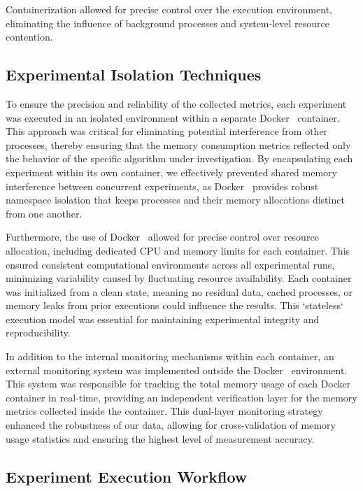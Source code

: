 Containerization allowed for precise control over the execution environment, eliminating the influence of background processes and system-level resource contention.

\subsection{Experimental Isolation Techniques}
\label{subsec:mmc-experimental-isolation-techniques}

To ensure the precision and reliability of the collected metrics, each experiment was executed in an isolated environment within a separate Docker~\cite{docker} container.
This approach was critical for eliminating potential interference from other processes, thereby ensuring that the memory consumption metrics reflected only the behavior of the specific algorithm under investigation.
By encapsulating each experiment within its own container, we effectively prevented shared memory interference between concurrent experiments, as Docker~\cite{docker} provides robust namespace isolation that keeps processes and their memory allocations distinct from one another.

Furthermore, the use of Docker~\cite{docker} allowed for precise control over resource allocation, including dedicated CPU and memory limits for each container.
This ensured consistent computational environments across all experimental runs, minimizing variability caused by fluctuating resource availability.
Each container was initialized from a clean state, meaning no residual data, cached processes, or memory leaks from prior executions could influence the results.
This `stateless` execution model was essential for maintaining experimental integrity and reproducibility.

In addition to the internal monitoring mechanisms within each container, an external monitoring system was implemented outside the Docker~\cite{docker} environment.
This system was responsible for tracking the total memory usage of each Docker~\cite{docker} container in real-time, providing an independent verification layer for the memory metrics collected inside the container.
This dual-layer monitoring strategy enhanced the robustness of our data, allowing for cross-validation of memory usage statistics and ensuring the highest level of measurement accuracy.

\subsection{Experiment Execution Workflow}
\label{subsec:mmc-experiment-execution-workflow}

